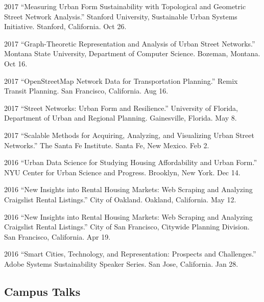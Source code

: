 \documentclass[12pt,letterpaper]{report}
\begin{document}
\begin{tablist}
\item[2017] \tab \enquote{Measuring Urban Form Sustainability with Topological and Geometric Street Network Analysis.} Stanford University, Sustainable Urban Systems Initiative. Stanford, California. Oct 26.

\item[2017] \tab \enquote{Graph-Theoretic Representation and Analysis of Urban Street Networks.} Montana State University, Department of Computer Science. Bozeman, Montana. Oct 16.

\item[2017] \tab \enquote{OpenStreetMap Network Data for Transportation Planning.} Remix Transit Planning. San Francisco, California. Aug 16.

\item[2017] \tab \enquote{Street Networks: Urban Form and Resilience.} University of Florida, Department of Urban and Regional Planning. Gainesville, Florida. May 8.

\item[2017] \tab \enquote{Scalable Methods for Acquiring, Analyzing, and Visualizing Urban Street Networks.} The Santa Fe Institute. Santa Fe, New Mexico. Feb 2.

\item[2016] \tab \enquote{Urban Data Science for Studying Housing Affordability and Urban Form.} NYU Center for Urban Science and Progress. Brooklyn, New York. Dec 14.

\item[2016] \tab \enquote{New Insights into Rental Housing Markets: Web Scraping and Analyzing Craigslist Rental Listings.} City of Oakland. Oakland, California. May 12.

\item[2016] \tab \enquote{New Insights into Rental Housing Markets: Web Scraping and Analyzing Craigslist Rental Listings.} City of San Francisco, Citywide Planning Division. San Francisco, California. Apr 19.

\item[2016] \tab \enquote{Smart Cities, Technology, and Representation: Prospects and Challenges.} Adobe Systems Sustainability Speaker Series. San Jose, California. Jan 28.

\end{tablist}

\subsection*{Campus Talks}
\end{document}
